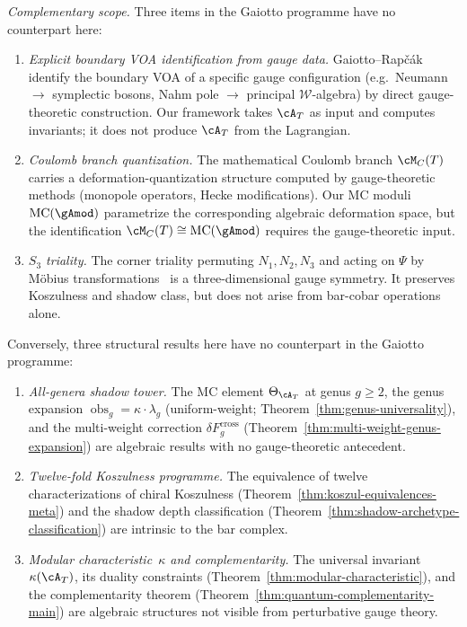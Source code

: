\begin{remark}
\emph{Complementary scope.}
Three items in the Gaiotto programme have no counterpart here:
\begin{enumerate}[label=\textup{(\alph*)}]
\item \emph{Explicit boundary VOA identification from gauge data.}
 Gaiotto--Rap\v{c}\'ak~\cite{gaiotto-rapchak} identify the
 boundary VOA of a specific gauge configuration (e.g.\
 Neumann $\to$ symplectic bosons,
 Nahm pole $\to$ principal $\mathcal{W}$-algebra) by
 direct gauge-theoretic construction. Our framework takes
 $\cA_T$ as input and computes invariants; it does not
 produce $\cA_T$ from the Lagrangian.

\item \emph{Coulomb branch quantization.}
 The mathematical Coulomb branch
 $\cM_C(T)$~\cite{BFN18} carries a
 deformation-quantization structure computed by gauge-theoretic
 methods (monopole operators, Hecke modifications). Our MC
 moduli $\operatorname{MC}(\gAmod)$ parametrize the
 corresponding algebraic deformation space, but the
 identification $\cM_C(T) \cong \operatorname{MC}(\gAmod)$
 requires the gauge-theoretic input.

\item \emph{$S_3$ triality.}
 The corner triality permuting $N_1, N_2, N_3$ and acting on
 $\Psi$ by M\"obius
 transformations~\cite{gaiotto-rapchak}
 is a three-dimensional gauge symmetry. It preserves
 Koszulness and shadow class, but does not arise from bar-cobar
 operations alone.
\end{enumerate}
Conversely, three structural results here have no counterpart
in the Gaiotto programme:
\begin{enumerate}[label=\textup{(\alph*)}]
\item \emph{All-genera shadow tower.}
 The MC element $\Theta_{\cA_T}$ at genus $g \geq 2$,
 the genus expansion
 $\operatorname{obs}_g = \kappa \cdot \lambda_g$
 (uniform-weight; Theorem~\ref{thm:genus-universality}),
 and the multi-weight correction $\delta F_g^{\mathrm{cross}}$
 (Theorem~\ref{thm:multi-weight-genus-expansion}) are
 algebraic results with no gauge-theoretic antecedent.

\item \emph{Twelve-fold Koszulness programme.}
 The equivalence of twelve characterizations of chiral
 Koszulness
 (Theorem~\ref{thm:koszul-equivalences-meta}) and the
 shadow depth classification
 (Theorem~\ref{thm:shadow-archetype-classification}) are
 intrinsic to the bar complex.

\item \emph{Modular characteristic~$\kappa$ and complementarity.}
 The universal invariant~$\kappa(\cA_T)$, its duality
 constraints (Theorem~\ref{thm:modular-characteristic}),
 and the complementarity theorem
 (Theorem~\ref{thm:quantum-complementarity-main}) are
 algebraic structures not visible from perturbative gauge
 theory.
\end{enumerate}
\end{remark}


